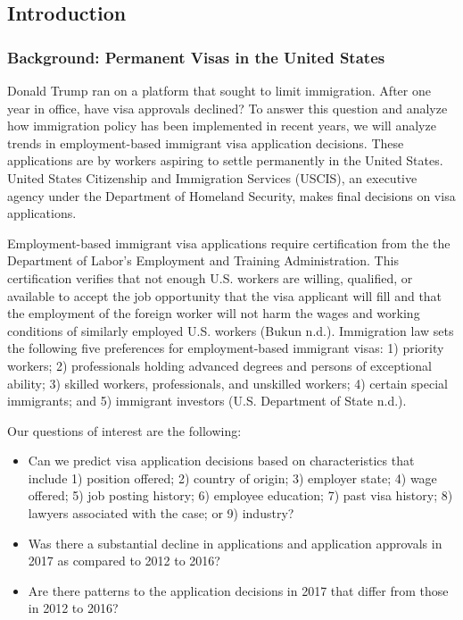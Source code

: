 \documentclass[]{article}
\providecommand{\tightlist}{%
  \setlength{\itemsep}{0pt}\setlength{\parskip}{0pt}}
\begin{document}
\subsection{Introduction}\label{introduction}

\subsubsection{Background: Permanent Visas in the United
States}\label{background-permanent-visas-in-the-united-states}

Donald Trump ran on a platform that sought to limit immigration. After
one year in office, have visa approvals declined? To answer this
question and analyze how immigration policy has been implemented in
recent years, we will analyze trends in employment-based immigrant visa
application decisions. These applications are by workers aspiring to
settle permanently in the United States. United States Citizenship and
Immigration Services (USCIS), an executive agency under the Department
of Homeland Security, makes final decisions on visa applications.

Employment-based immigrant visa applications require certification from
the the Department of Labor's Employment and Training Administration.
This certification verifies that not enough U.S. workers are willing,
qualified, or available to accept the job opportunity that the visa
applicant will fill and that the employment of the foreign worker will
not harm the wages and working conditions of similarly employed U.S.
workers (Bukun n.d.). Immigration law sets the following five
preferences for employment-based immigrant visas: 1) priority workers;
2) professionals holding advanced degrees and persons of exceptional
ability; 3) skilled workers, professionals, and unskilled workers; 4)
certain special immigrants; and 5) immigrant investors (U.S. Department
of State n.d.).

Our questions of interest are the following:

\begin{itemize}
\tightlist
\item
  Can we predict visa application decisions based on characteristics
  that include 1) position offered; 2) country of origin; 3) employer
  state; 4) wage offered; 5) job posting history; 6) employee education;
  7) past visa history; 8) lawyers associated with the case; or 9)
  industry?
\item
  Was there a substantial decline in applications and application
  approvals in 2017 as compared to 2012 to 2016?
\item
  Are there patterns to the application decisions in 2017 that differ
  from those in 2012 to 2016?
\end{itemize}
\end{document}
